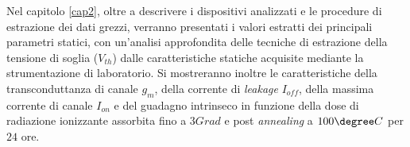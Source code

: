 Nel capitolo \ref{cap2}, oltre a descrivere i dispositivi analizzati e le procedure di estrazione dei dati grezzi, verranno presentati i valori estratti dei principali parametri statici, con un'analisi approfondita delle tecniche di estrazione della tensione di soglia ($V_{th}$) dalle caratteristiche statiche acquisite mediante la strumentazione di laboratorio. Si mostreranno inoltre le caratteristiche della transconduttanza di canale $g_m$, della corrente di \emph{leakage} $I_{off}$, della massima corrente di canale $I_{on}$ e del guadagno intrinseco in funzione della dose di radiazione ionizzante assorbita fino a $3 Grad$ e post \emph{annealing} a $100\degree C$ per $24$ ore.
